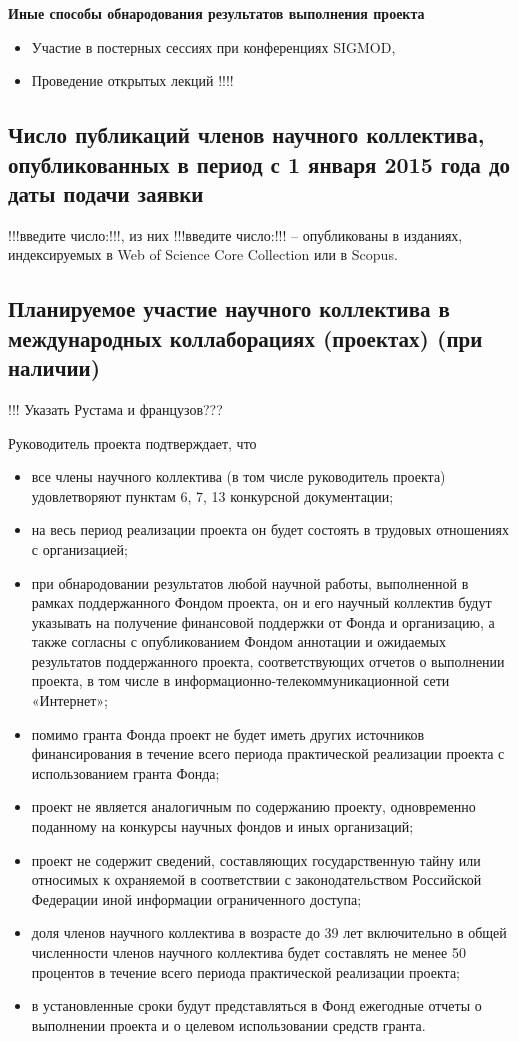 \documentclass[12pt]{article}  %
\theoremstyle{remark}
\begin{document}
\textbf{Иные способы обнародования результатов выполнения проекта}
\begin{itemize}
\item Участие в постерных сессиях при конференциях SIGMOD,
\item Проведение открытых лекций !!!!

\end{itemize}

\subsection{Число публикаций членов научного коллектива, опубликованных в период с 1 января 2015 года до даты подачи заявки}

!!!введите число:!!!, из них !!!введите число:!!! – опубликованы в изданиях, индексируемых в Web of Science Core Collection или в Scopus.

\subsection{Планируемое участие научного коллектива в международных коллаборациях (проектах) (при наличии)}
!!! Указать Рустама и французов???

\vline
Руководитель проекта подтверждает, что
\begin{itemize}
\item все члены научного коллектива (в том числе руководитель проекта) удовлетворяют пунктам 6, 7, 13 конкурсной документации;
\item на весь период реализации проекта он будет состоять в трудовых отношениях с организацией;
\item при обнародовании результатов любой научной работы, выполненной в рамках поддержанного Фондом проекта, он и его научный коллектив будут указывать на получение финансовой поддержки от Фонда и организацию, а также согласны с опубликованием Фондом аннотации и ожидаемых результатов поддержанного проекта, соответствующих отчетов о выполнении проекта, в том числе в информационно-телекоммуникационной сети «Интернет»;
\item помимо гранта Фонда проект не будет иметь других источников финансирования в течение всего периода практической реализации проекта с использованием гранта Фонда;
\item проект не является аналогичным по содержанию проекту, одновременно поданному на конкурсы научных фондов и иных организаций;
\item проект не содержит сведений, составляющих государственную тайну или относимых к охраняемой в соответствии с законодательством Российской Федерации иной информации ограниченного доступа;
\item доля членов научного коллектива в возрасте до 39 лет включительно в общей численности членов научного коллектива будет составлять не менее 50 процентов в течение всего периода практической реализации проекта;
\item в установленные сроки будут представляться в Фонд ежегодные отчеты о выполнении проекта и о целевом использовании средств гранта.
\end{itemize}
\end{document}
